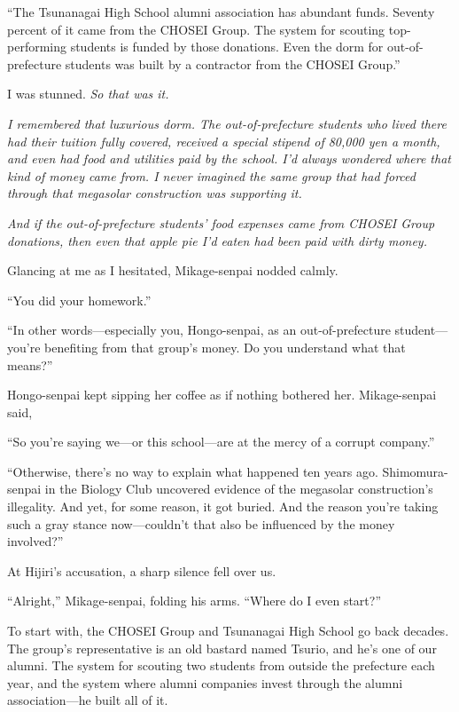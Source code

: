 \documentclass[
    a4paper,
    12pt,
    twoside,
    openany,
    UTF8,
    fontset=windows
]{ctexbook}
\begin{document}
``The Tsunanagai High School alumni association has abundant funds. Seventy percent of it came from the CHOSEI Group. The system for scouting top-performing students is funded by those donations. Even the dorm for out-of-prefecture students was built by a contractor from the CHOSEI Group.''

I was stunned. \textit{So that was it.}

\textit{I remembered that luxurious dorm. The out-of-prefecture students who lived there had their tuition fully covered, received a special stipend of 80,000 yen a month, and even had food and utilities paid by the school. I'd always wondered where that kind of money came from. I never imagined the same group that had forced through that megasolar construction was supporting it.}

\textit{And if the out-of-prefecture students' food expenses came from CHOSEI Group donations, then even that apple pie I'd eaten had been paid with dirty money.}

Glancing at me as I hesitated, Mikage-senpai nodded calmly.

``You did your homework.''

``In other words---especially you, Hongo-senpai, as an out-of-prefecture student---you're benefiting from that group's money. Do you understand what that means?''

Hongo-senpai kept sipping her coffee as if nothing bothered her. Mikage-senpai said,

``So you're saying we---or this school---are at the mercy of a corrupt company.''

``Otherwise, there's no way to explain what happened ten years ago. Shimomura-senpai in the Biology Club uncovered evidence of the megasolar construction's illegality. And yet, for some reason, it got buried. And the reason you're taking such a gray stance now---couldn't that also be influenced by the money involved?''

At Hijiri's accusation, a sharp silence fell over us.

``Alright,'' Mikage-senpai, folding his arms. ``Where do I even start?''

To start with, the CHOSEI Group and Tsunanagai High School go back decades. The group's representative is an old bastard named Tsurio, and he's one of our alumni. The system for scouting two students from outside the prefecture each year, and the system where alumni companies invest through the alumni association---he built all of it.
\end{document}
